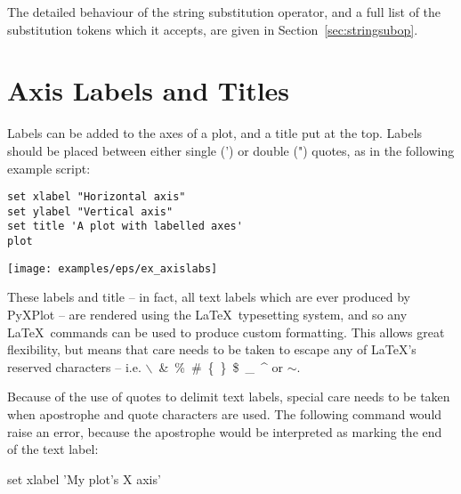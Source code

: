 \vspace{3mm}
\newline
{}\newline
{}\newline
{}\newline
{}
\vspace{3mm}

The detailed behaviour of the string substitution operator, and a full list of
the substitution tokens which it accepts, are given in
Section~\ref{sec:stringsubop}.

\section{Axis Labels and Titles}
\label{sec:latex_incompatibility}

Labels can be added to the axes of a plot, and a title put at the top.  Labels
should be placed between either single (') or double (") quotes, as in the
following example script:

\begin{verbatim}
set xlabel "Horizontal axis"
set ylabel "Vertical axis"
set title 'A plot with labelled axes'
plot
\end{verbatim}

\begin{center}
\texttt{[image: examples/eps/ex\_axislabs]}
\end{center}

\noindent These labels and title -- in fact, all text labels which are ever
produced by PyXPlot -- are rendered using the \LaTeX\ typesetting system, and
so any \LaTeX\ commands can be used to produce custom formatting. This allows
great flexibility, but means that care needs to be taken to escape any of
\LaTeX's reserved characters -- i.e. $\backslash$~\&~\%~\#~\{~\}~\$~\_~\^{} or
$\sim$.

Because of the use of quotes to delimit text labels, special care needs to be
taken when apostrophe and quote characters are used. The following command
would raise an error, because the apostrophe would be interpreted as marking
the end of the text label:

\begin{dontdo}
set xlabel 'My plot's X axis'
\end{dontdo}

